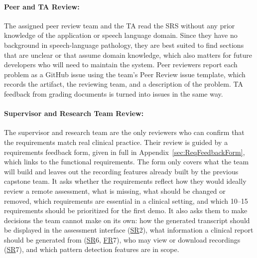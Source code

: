 \documentclass[12pt, titlepage]{article}
\newcommand{\srsfr}[1]{\href{https://github.com/Nour-Fawaz/MacaBoca/blob/main/pdfs/SRS/SRS.pdf}{FR}}
\newcommand{\srssr}[1]{\href{https://github.com/Nour-Fawaz/MacaBoca/blob/main/pdfs/SRS/SRS.pdf}{SR}}
\renewcommand{\_}{\oldunderscore\allowbreak}
\begin{document}
\paragraph{Peer and TA Review:}
The assigned peer review team and the TA read the SRS without any prior knowledge of the application or speech language domain. 
Since they have no background in speech-language pathology, they are best suited to find sections that are unclear or that assume domain knowledge, which also matters for future developers who will need to maintain the system. 
Peer reviewers report each problem as a GitHub issue using the team's Peer Review issue template, which records the artifact, the reviewing team, and a description of the problem. TA feedback from grading documents is turned into issues in the same way.

\paragraph{Supervisor and Research Team Review:}
The supervisor and research team are the only reviewers who can confirm that the requirements match real clinical practice.
Their review is guided by a requirements feedback form, given in full in Appendix~\ref{sec:ReqFeedbackForm}, which links to the functional requirements. The form only covers what the team will build and leaves out the recording features already built by the previous capstone team. It asks whether the requirements reflect how they would ideally review a remote assessment, what is missing, what should be changed or removed, which requirements are essential in a clinical setting, and which 10--15 requirements should be prioritized for the first demo. It also asks them to make decisions the team cannot make on its own: how the generated transcript should be displayed in the assessment interface (\srssr*{2}), what information a clinical report should be generated from (\srssr*{6}, \srsfr*{7}), who may view or download recordings (\srssr*{7}), and which pattern detection features are in scope.
\end{document}

